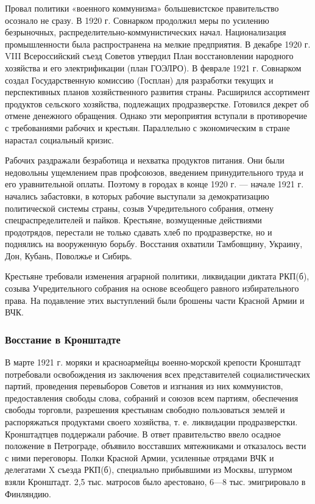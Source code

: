 \documentclass{article}
\begin{document}
\hfill

Провал политики «военного коммунизма» большевистское правительство осознало не сразу. В 1920 г. Совнарком продолжил меры по усилению безрыночных, распределительно-коммунистических начал. Национализация промышленности была распространена на мелкие предприятия. В декабре 1920 г. VIII Всероссийский съезд Советов утвердил План восстановлении народного хозяйства и его электрификации (план ГОЭЛРО). В феврале 1921 г. Совнарком создал Государственную комиссию (Госплан) для разработки текущих и перспективных планов хозяйственного развития страны. Расширился ассортимент продуктов сельского хозяйства, подлежащих продразверстке. Готовился декрет об отмене денежного обращения. Однако эти мероприятия вступали в противоречие с требованиями рабочих и крестьян. Параллельно с экономическим в стране нарастал социальный кризис.

\hfill

Рабочих раздражали безработица и нехватка продуктов питания. Они были недовольны ущемлением прав профсоюзов, введением принудительного труда и его уравнительной оплаты. Поэтому в городах в конце 1920 г. — начале 1921 г. начались забастовки, в которых рабочие выступали за демократизацию политической системы страны, созыв Учредительного собрания, отмену спецраспределителей и пайков. Крестьяне, возмущенные действиями продотрядов, перестали не только сдавать хлеб по продразверстке, но и поднялись на вооруженную борьбу. Восстания охватили Тамбовщину, Украину, Дон, Кубань, Поволжье и Сибирь.

\hfill

Крестьяне требовали изменения аграрной политики, ликвидации диктата РКП(б), созыва Учредительного собрания на основе всеобщего равного избирательного права. На подавление этих выступлений были брошены части Красной Армии и ВЧК.

\subsubsection{Восстание в Кронштадте}

В марте 1921 г. моряки и красноармейцы военно-морской крепости Кронштадт потребовали освобождения из заключения всех представителей социалистических партий, проведения перевыборов Советов и изгнания из них коммунистов, предоставления свободы слова, собраний и союзов всем партиям, обеспечения свободы торговли, разрешения крестьянам свободно пользоваться землей и распоряжаться продуктами своего хозяйства, т. е. ликвидации продразверстки. Кронштадтцев поддержали рабочие. В ответ правительство ввело осадное положение в Петрограде, объявило восставших мятежниками и отказалось вести с ними переговоры. Полки Красной Армии, усиленные отрядами ВЧК и делегатами X съезда РКП(б), специально прибывшими из Москвы, штурмом взяли Кронштадт. 2,5 тыс. матросов было арестовано, 6—8 тыс. эмигрировало в Финляндию.
\end{document}
